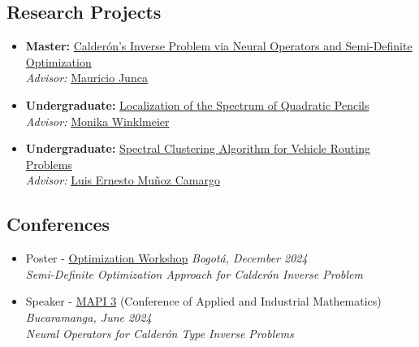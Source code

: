 \documentclass{article}
\begin{document}
\subsection*{Research Projects}
\begin{itemize}
\item \textbf{Master:} \href{https://repositorio.uniandes.edu.co/server/api/core/bitstreams/d3a2a70b-554f-4d57-accb-289addc7d4e6/content}{Calder\'on's Inverse Problem via Neural Operators and Semi-Definite Optimization}\\
\textit{Advisor:} \href{https://math.uniandes.edu.co/~mjunca/}{Mauricio Junca}
\item \textbf{Undergraduate:} \href{https://repositorio.uniandes.edu.co/server/api/core/bitstreams/b6b169c8-b88e-451f-9f09-ea57bf1e4cb3/content}{Localization of the Spectrum of Quadratic Pencils}\\
\textit{Advisor:} \href{https://math.uniandes.edu.co/~mwinklme/index.php}{Monika Winklmeier}
\item \textbf{Undergraduate:} \href{https://repositorio.uniandes.edu.co/server/api/core/bitstreams/801d284a-b76d-457f-8be0-38a3b5359259/content}{Spectral Clustering Algorithm for Vehicle Routing Problems}\\
\textit{Advisor:} \href{https://scholar.google.com/citations?user=duh26OUAAAAJ}{Luis Ernesto Muñoz Camargo}
\end{itemize}
\subsection*{Conferences} 
\begin{itemize}
\item Poster - \href{https://optimization-workshop.github.io/}{\textcolor{myblue}{Optimization Workshop}} \hfill \emph{Bogot\'a, December 2024}\\
\textit{Semi-Definite Optimization Approach for Calder\'on Inverse Problem}
\item Speaker - \href{https://scm.org.co/mapi-3/}{\textcolor{myblue}{MAPI 3}} (Conference of Applied and Industrial Mathematics) \hfill \emph{Bucaramanga, June 2024}\\
\textit{Neural Operators for Calder\'on Type Inverse Problems}
\end{itemize}
\end{document}
